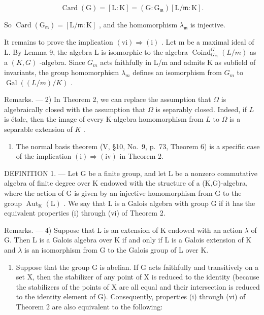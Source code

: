 \[
\operatorname{Card} (\mathrm{G}) = [ \mathrm{L}: \mathrm{K} ] = (\mathrm{G}: \mathrm{G} _ {\mathfrak {m}}) [ \mathrm{L} / \mathfrak {m}: \mathrm{K} ].
\]

So \(\operatorname{Card}(\mathrm{G}_{\mathfrak{m}}) = [\mathrm{L} / \mathfrak{m}:\mathrm{K}]\) , and the homomorphism \(\lambda_{\mathfrak{m}}\) is injective.

It remains to prove the implication \((\mathrm{vi})\Rightarrow(\mathrm{i})\) . Let m be a maximal ideal of L. By Lemma 9, the algebra L is isomorphic to the algebra \(\operatorname{Coind}_{G_{m}}^{G}(L/m)\) as a \((K,G)\) -algebra. Since \(G_{m}\) acts faithfully in L/m and admits K as subfield of invariants, the group homomorphism \(\lambda_{m}\) defines an isomorphism from \(G_{m}\) to \(\operatorname{Gal}((L/m)/K)\) .

Remarks. --- 2) In Theorem 2, we can replace the assumption that \(\Omega\) is algebraically closed with the assumption that \(\Omega\) is separably closed. Indeed, if \(L\) is étale, then the image of every K-algebra homomorphism from \(L\) to \(\Omega\) is a separable extension of \(K\) .

\begin{enumerate}
\def\labelenumi{\arabic{enumi})}
\setcounter{enumi}{2}
\tightlist
\item
  The normal basis theorem (V, §10, No.~9, p.~73, Theorem 6) is a specific case of the implication \((\mathrm{i})\Rightarrow (\mathrm{iv})\) in Theorem 2.
\end{enumerate}

DEFINITION 1. --- Let G be a finite group, and let L be a nonzero commutative algebra of finite degree over K endowed with the structure of a (K,G)-algebra, where the action of G is given by an injective homomorphism from G to the group \(\operatorname{Aut}_{\mathrm{K}}(\mathrm{L})\) . We say that L is a Galois algebra with group G if it has the equivalent properties (i) through (vi) of Theorem 2.

Remarks. --- 4) Suppose that L is an extension of K endowed with an action \(\lambda\) of G. Then L is a Galois algebra over K if and only if L is a Galois extension of K and \(\lambda\) is an isomorphism from G to the Galois group of L over K.

\begin{enumerate}
\def\labelenumi{\arabic{enumi})}
\setcounter{enumi}{4}
\tightlist
\item
  Suppose that the group G is abelian. If G acts faithfully and transitively on a set X, then the stabilizer of any point of X is reduced to the identity (because the stabilizers of the points of X are all equal and their intersection is reduced to the identity element of G). Consequently, properties (i) through (vi) of Theorem 2 are also equivalent to the following:
\end{enumerate}

